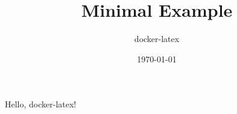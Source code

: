 \documentclass{article}
\title{Minimal Example}
\author{docker-latex}
\date{\today}
\begin{document}
\maketitle
Hello, docker-latex!
\end{document}
